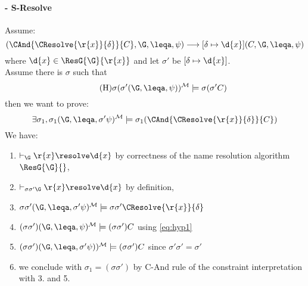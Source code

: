\paragraph{- \sc S-Resolve} Assume:
$$(\CAnd{\CResolve{\r{x}}{\delta}}{C},\G,\leqa,\psi) \longrightarrow [\delta \mapsto \d{x}](C,\G,\leqa,\psi) $$
where $\d{x} \in \ResG{\G}{\r{x}}$ and let $\sigma'$ be $[\delta \mapsto \d{x}]$.\\
Assume there is $\sigma$ such that 
\begin{equation}\tag{H}
  \label{eq:hyp1}
\sigma(\sigma'(\G,\leqa,\psi))\tomod\models \sigma(\sigma'C)
\end{equation}
then we want to prove:
\begin{equation*}
\exists \sigma_1, \sigma_1(\G,\leqa,\sigma'\psi)\tomod\models \sigma_1(\CAnd{\CResolve{\r{x}}{\delta}}{C})
\end{equation*}
We have:  
\begin{enumerate}
 \item $\vdash_\G \r{x} \resolve \d{x}$ by correctness of the name resolution algorithm $\ResG{\G}{}$,
 \item $\vdash_{\sigma\sigma'\G} \r{x} \resolve \d{x}$ by definition,
 \item $\sigma\sigma'(\G,\leqa,\sigma'\psi)\tomod\models \sigma\sigma'\CResolve{\r{x}}{\delta}$
 \item $ (\sigma\sigma')(\G,\leqa,\psi)\tomod\models (\sigma\sigma')C$ using \ref{eq:hyp1}  
 \item $ (\sigma\sigma')(\G,\leqa,\sigma'\psi))\tomod\models (\sigma\sigma')C$ since $\sigma'\sigma'=\sigma'$
 \item we conclude with $\sigma_1=(\sigma\sigma')$ by {\sc C-And} rule of the constraint interpretation with 3. and 5.
\end{enumerate}
\sepa
